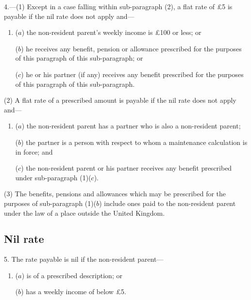 \documentclass[a4paper]{article}
\begin{document}
{4.---(1) Except in a case falling within sub-paragraph (2), a flat rate of £5 is payable if the nil rate does not apply and---
\begin{enumerate}\item[]
($a$) the non-resident parent’s  weekly income is £100 or less; or

($b$) he receives any benefit, pension or allowance prescribed for the purposes of this paragraph of this sub-paragraph; or

($c$) he or his partner (if any) receives any benefit prescribed for the purposes of this paragraph of this sub-paragraph.
\end{enumerate}

(2)
A flat rate of a prescribed amount is payable if the nil rate does not apply and---
\begin{enumerate}\item[]
($a$) the non-resident parent has a partner who is also a non-resident parent;

($b$) the partner is a person with respect to whom a maintenance calculation is in force; and

($c$) the non-resident parent or his partner receives any benefit prescribed under sub-paragraph (1)($c$).
\end{enumerate}

(3)
The benefits, pensions and allowances which may be prescribed for the purposes of sub-paragraph (1)($b$) include ones paid to the non-resident parent under the law of a place outside the United Kingdom.


\subsection*{Nil rate}

5. The rate payable is nil if the non-resident parent---
\begin{enumerate}\item[]
($a$) is of a prescribed description; or

($b$) has a   weekly income of below £5.
\end{enumerate}

}
\end{document}
